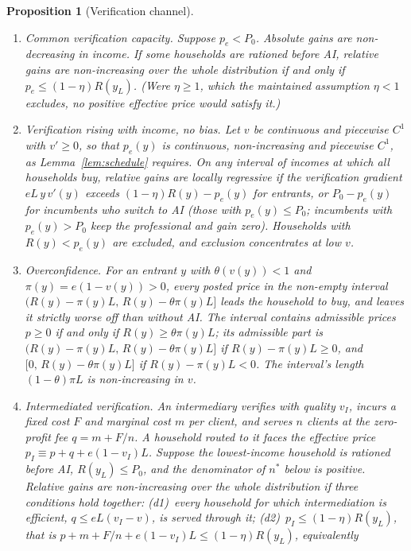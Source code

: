 \documentclass[12pt]{article}
\newtheorem{proposition}{Proposition}
\theoremstyle{remark}
\begin{document}
\begin{proposition}[Verification channel]\label{prop:verification}
\begin{enumerate}[label=(\alph*),itemsep=1pt]
\item \emph{Common verification capacity.} Suppose $p_e<P_0$. Absolute gains are non-decreasing in income. If some households are rationed before AI, relative gains are non-increasing over the whole distribution \emph{if and only if} $p_e\le(1-\eta)R(y_L)$. (Were $\eta\ge1$, which the maintained assumption $\eta<1$ excludes, no positive effective price would satisfy it.)
\item \emph{Verification rising with income, no bias.} Let $v$ be continuous and piecewise $C^1$ with $v'\ge0$, so that $p_e(y)$ is continuous, non-increasing and piecewise $C^1$, as Lemma~\ref{lem:schedule} requires. On any interval of incomes at which all households buy, relative gains are locally regressive if the verification gradient $eL\,y\,v'(y)$ exceeds $(1-\eta)R(y)-p_e(y)$ for entrants, or $P_0-p_e(y)$ for incumbents who switch to AI (those with $p_e(y)\le P_0$; incumbents with $p_e(y)>P_0$ keep the professional and gain zero). Households with $R(y)<p_e(y)$ are excluded, and exclusion concentrates at low $v$.
\item \emph{Overconfidence.} For an entrant $y$ with $\theta(v(y))<1$ and $\pi(y)=e(1-v(y))>0$, every posted price in the non-empty interval $\big(R(y)-\pi(y)L,\,R(y)-\theta\pi(y)L\big]$ leads the household to buy, and leaves it strictly worse off than without AI. The interval contains admissible prices $p\ge0$ if and only if $R(y)\ge\theta\pi(y)L$; its admissible part is $\big(R(y)-\pi(y)L,\,R(y)-\theta\pi(y)L\big]$ if $R(y)-\pi(y)L\ge0$, and $\big[0,\,R(y)-\theta\pi(y)L\big]$ if $R(y)-\pi(y)L<0$. The interval's length $(1-\theta)\pi L$ is non-increasing in $v$.
\item \emph{Intermediated verification.} An intermediary verifies with quality $v_I$, incurs a fixed cost $F$ and marginal cost $m$ per client, and serves $n$ clients at the zero-profit fee $q=m+F/n$. A household routed to it faces the effective price $p_I\equiv p+q+e(1-v_I)L$. Suppose the lowest-income household is rationed before AI, $R(y_L)\le P_0$, and the denominator of $n^*$ below is positive. Relative gains are non-increasing over the whole distribution if three conditions hold together: (d1)~every household for which intermediation is efficient, $q\le eL(v_I-v)$, is served through it; (d2)~$p_I\le(1-\eta)R(y_L)$, that is $p+m+F/n+e(1-v_I)L\le(1-\eta)R(y_L)$, equivalently

\end{enumerate}
\end{proposition}
\end{document}
